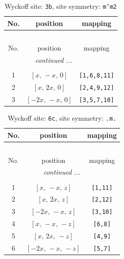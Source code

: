 \documentclass[fleqn,8pt]{jsarticle}
\begin{document}
\begin{longtable}{ccc}
\caption{Wyckoff site: {\tt 3b}, site symmetry: {\tt m'm2}}
 \\
 \hline \hline
No. & position & mapping \\ \hline \endfirsthead

\multicolumn{2}{l}{\tablename\ \thetable{}} \\
 \hline \hline
No. & position & mapping \\ \hline \endhead

 \hline \hline
\multicolumn{2}{r}{\footnotesize\it continued ...} \\ \endfoot

 \hline \hline
\multicolumn{2}{r}{} \\ \endlastfoot

1 & $\left[ x,\, - x,\, 0 \right]$ & {\tt [1,6,8,11]} \\ \hline
2 & $\left[ x,\, 2 x,\, 0 \right]$ & {\tt [2,4,9,12]} \\ \hline
3 & $\left[ - 2 x,\, - x,\, 0 \right]$ & {\tt [3,5,7,10]} \\
\end{longtable}
\renewcommand{\arraystretch}{1.2}
\begin{longtable}{ccc}
\caption{Wyckoff site: {\tt 6c}, site symmetry: {\tt .m.}}
 \\
 \hline \hline
No. & position & mapping \\ \hline \endfirsthead

\multicolumn{2}{l}{\tablename\ \thetable{}} \\
 \hline \hline
No. & position & mapping \\ \hline \endhead

 \hline \hline
\multicolumn{2}{r}{\footnotesize\it continued ...} \\ \endfoot

 \hline \hline
\multicolumn{2}{r}{} \\ \endlastfoot

1 & $\left[ x,\, - x,\, z \right]$ & {\tt [1,11]} \\ \hline
2 & $\left[ x,\, 2 x,\, z \right]$ & {\tt [2,12]} \\ \hline
3 & $\left[ - 2 x,\, - x,\, z \right]$ & {\tt [3,10]} \\ \hline
4 & $\left[ x,\, - x,\, - z \right]$ & {\tt [6,8]} \\ \hline
5 & $\left[ x,\, 2 x,\, - z \right]$ & {\tt [4,9]} \\ \hline
6 & $\left[ - 2 x,\, - x,\, - z \right]$ & {\tt [5,7]} \\
\end{longtable}
\end{document}
